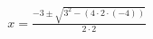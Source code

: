 \documentclass[preview]{standalone}
\begin{document}
\begin{align*}
x = \frac{-3 \pm \sqrt{3^2 - (4 \cdot 2 \cdot (-4))}}{2 \cdot 2}
\end{align*}
\end{document}
